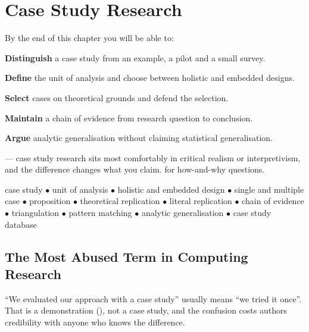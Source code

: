 \chapter{Case Study Research}\label{ch:casestudy}

\begin{outcomes}
By the end of this chapter you will be able to:
\begin{tight}
  \item \textbf{Distinguish} a case study from an example, a pilot and a small
    survey.
  \item \textbf{Define} the unit of analysis and choose between holistic and
    embedded designs.
  \item \textbf{Select} cases on theoretical grounds and defend the selection.
  \item \textbf{Maintain} a chain of evidence from research question to
    conclusion.
  \item \textbf{Argue} analytic generalisation without claiming statistical
    generalisation.
\end{tight}
\end{outcomes}

\begin{prereq}
 --- case study research sits most comfortably in critical
realism or interpretivism, and the difference changes what you claim.
 for how-and-why questions.
\end{prereq}

\begin{keyterms}
case study $\bullet$ unit of analysis $\bullet$ holistic and embedded design
$\bullet$ single and multiple case $\bullet$ proposition $\bullet$ theoretical
replication $\bullet$ literal replication $\bullet$ chain of evidence $\bullet$
triangulation $\bullet$ pattern matching $\bullet$ analytic generalisation
$\bullet$ case study database
\end{keyterms}

\section{The Most Abused Term in Computing Research}

``We evaluated our approach with a case study'' usually means ``we tried it
once''. That is a demonstration (), not a case study, and
the confusion costs authors credibility with anyone who knows the difference.

